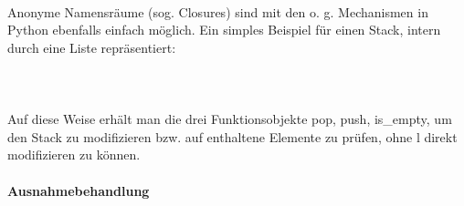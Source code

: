 \\
Anonyme Namensräume (sog. Closures) sind mit den o. g. Mechanismen in Python ebenfalls einfach möglich. Ein simples Beispiel für einen Stack, intern durch eine Liste repräsentiert:\\
\\
\\
\\
Auf diese Weise erhält man die drei Funktionsobjekte pop, push, is\_empty, um den Stack zu modifizieren bzw. auf enthaltene Elemente zu prüfen, ohne l direkt modifizieren zu können.\\

\paragraph{Ausnahmebehandlung}\ \\


